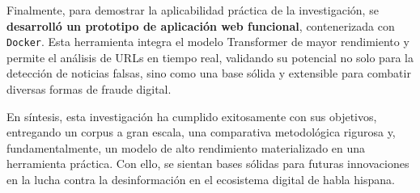 Finalmente, para demostrar la aplicabilidad práctica de la investigación, se \textbf{desarrolló un prototipo de aplicación web funcional}, contenerizada con \texttt{Docker}. Esta herramienta integra el modelo Transformer de mayor rendimiento y permite el análisis de URLs en tiempo real, validando su potencial no solo para la detección de noticias falsas, sino como una base sólida y extensible para combatir diversas formas de fraude digital.

En síntesis, esta investigación ha cumplido exitosamente con sus objetivos, entregando un corpus a gran escala, una comparativa metodológica rigurosa y, fundamentalmente, un modelo de alto rendimiento materializado en una herramienta práctica. Con ello, se sientan bases sólidas para futuras innovaciones en la lucha contra la desinformación en el ecosistema digital de habla hispana.
